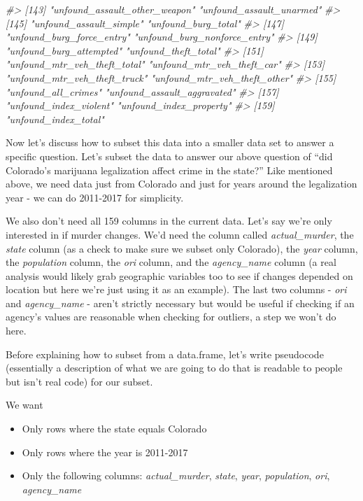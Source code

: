 \documentclass[
  12pt,
]{book}
\newenvironment{Shaded}{\begin{snugshade}}{\end{snugshade}}
\newcommand{\CommentTok}[1]{\textcolor[rgb]{0.37,0.37,0.37}{\textit{#1}}}
\providecommand{\tightlist}{%
  \setlength{\itemsep}{0pt}\setlength{\parskip}{0pt}}
\begin{document}
\begin{Shaded}
\begin{Highlighting}[]
\CommentTok{\#\textgreater{} [143] "unfound\_assault\_other\_weapon"   "unfound\_assault\_unarmed"       }
\CommentTok{\#\textgreater{} [145] "unfound\_assault\_simple"         "unfound\_burg\_total"            }
\CommentTok{\#\textgreater{} [147] "unfound\_burg\_force\_entry"       "unfound\_burg\_nonforce\_entry"   }
\CommentTok{\#\textgreater{} [149] "unfound\_burg\_attempted"         "unfound\_theft\_total"           }
\CommentTok{\#\textgreater{} [151] "unfound\_mtr\_veh\_theft\_total"    "unfound\_mtr\_veh\_theft\_car"     }
\CommentTok{\#\textgreater{} [153] "unfound\_mtr\_veh\_theft\_truck"    "unfound\_mtr\_veh\_theft\_other"   }
\CommentTok{\#\textgreater{} [155] "unfound\_all\_crimes"             "unfound\_assault\_aggravated"    }
\CommentTok{\#\textgreater{} [157] "unfound\_index\_violent"          "unfound\_index\_property"        }
\CommentTok{\#\textgreater{} [159] "unfound\_index\_total"}
\end{Highlighting}
\end{Shaded}

Now let's discuss how to subset this data into a smaller data set to answer a specific question. Let's subset the data to answer our above question of ``did Colorado's marijuana legalization affect crime in the state?'' Like mentioned above, we need data just from Colorado and just for years around the legalization year - we can do 2011-2017 for simplicity.

We also don't need all 159 columns in the current data. Let's say we're only interested in if murder changes. We'd need the column called \emph{actual\_murder}, the \emph{state} column (as a check to make sure we subset only Colorado), the \emph{year} column, the \emph{population} column, the \emph{ori} column, and the \emph{agency\_name} column (a real analysis would likely grab geographic variables too to see if changes depended on location but here we're just using it as an example). The last two columns - \emph{ori} and \emph{agency\_name} - aren't strictly necessary but would be useful if checking if an agency's values are reasonable when checking for outliers, a step we won't do here.

Before explaining how to subset from a data.frame, let's write pseudocode (essentially a description of what we are going to do that is readable to people but isn't real code) for our subset.

We want

\begin{itemize}
\tightlist
\item
  Only rows where the state equals Colorado
\item
  Only rows where the year is 2011-2017
\item
  Only the following columns: \emph{actual\_murder}, \emph{state}, \emph{year}, \emph{population}, \emph{ori}, \emph{agency\_name}
\end{itemize}
\end{document}
